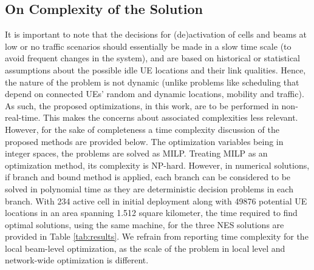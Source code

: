 \vspace{-5pt}

\subsection{On Complexity of the Solution}
It is important to note that the decisions for (de)activation of cells and beams at low or no traffic scenarios should essentially be made in a slow time scale (to avoid frequent changes in the system), and are based on historical or statistical assumptions about the possible idle UE locations and their link qualities. 
Hence, the nature of the problem is not dynamic (unlike problems like scheduling that depend on connected UEs' random and dynamic locations, mobility and traffic). As such, the proposed optimizations, in this work, are to be performed in non-real-time. This makes the concerns about associated complexities less relevant. However, for the sake of completeness a time complexity discussion of the proposed methods are provided below.
The optimization variables being in integer spaces, the problems are solved as MILP. Treating MILP as an optimization method, its complexity is NP-hard. However, in numerical solutions, if branch and bound method is applied, each branch can be considered to be solved in polynomial time as they are deterministic decision problems in each branch.
With 234 active cell in initial deployment along with 49876 potential UE locations in an area spanning 1.512 square kilometer, the time required to find optimal solutions, using the same machine, for the three NES solutions are provided in Table \ref{tab:results}. We refrain from reporting time complexity for the local beam-level optimization, as the scale of the problem in local level and network-wide optimization is different.


